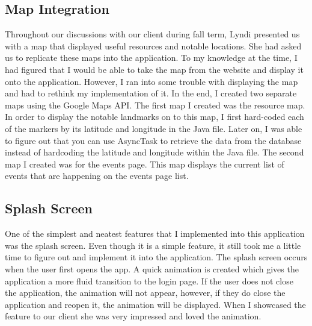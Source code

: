 \documentclass[draftclsnofoot, onecolumn, 10pt, compsoc]{IEEEtran}
\begin{document}
      \subsection{Map Integration}
         Throughout our discussions with our client during fall term, Lyndi presented us with a map that displayed useful resources and notable locations. She had asked us to replicate these maps into the application. To my knowledge at the time, I had figured that I would be able to take the map from the website and display it onto the application. However, I ran into some trouble with displaying the map and had to rethink my implementation of it. In the end, I created two separate maps using the Google Maps API. The first map I created was the resource map. In order to display the notable landmarks on to this map, I first hard-coded each of the markers by its latitude and longitude in the Java file. Later on, I was able to figure out that you can use AsyncTask to retrieve the data from the database instead of hardcoding the latitude and longitude within the Java file. The second map I created was for the events page. This map displays the current list of events that are happening on the events page list.

      \subsection{Splash Screen}
         One of the simplest and neatest features that I implemented into this application was the splash screen. Even though it is a simple feature, it still took me a little time to figure out and implement it into the application. The splash screen occurs when the user first opens the app. A quick animation is created which gives the application a more fluid transition to the login page. If the user does not close the application, the animation will not appear, however, if they do close the application and reopen it, the animation will be displayed. When I showcased the feature to our client she was very impressed and loved the animation.
\end{document}
